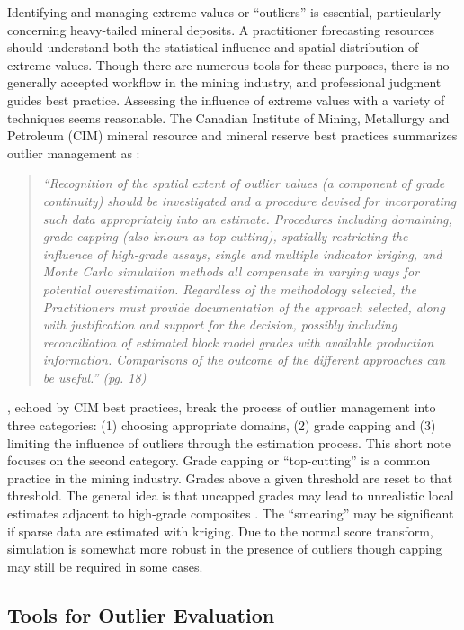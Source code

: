Identifying and managing extreme values or ``outliers'' is essential, particularly concerning heavy-tailed mineral deposits. A practitioner forecasting resources should understand both the statistical influence and spatial distribution of extreme values. Though there are numerous tools for these purposes, there is no generally accepted workflow in the mining industry, and professional judgment guides best practice. Assessing the influence of extreme values with a variety of techniques seems reasonable. The Canadian Institute of Mining, Metallurgy and Petroleum (CIM) mineral resource and mineral reserve best practices summarizes outlier management as \citep{cim2019}:

\blockquote{\textit{``Recognition of the spatial extent of outlier values (a component of grade continuity) should be investigated and a procedure devised for incorporating such data appropriately into an estimate. Procedures including domaining, grade capping (also known as top cutting), spatially restricting the influence of high-grade assays, single and multiple indicator kriging, and Monte Carlo simulation methods all compensate in varying ways for potential overestimation. Regardless of the methodology selected, the Practitioners must provide documentation of the approach selected, along with justification and support for the decision, possibly including reconciliation of estimated block model grades with available production information. Comparisons of the outcome of the different approaches can be useful.'' (pg. 18)}}

\cite{leuangthong2015dealing}, echoed by CIM best practices, break the process of outlier management into three categories: (1) choosing appropriate domains, (2) grade capping and (3) limiting the influence of outliers through the estimation process. This short note focuses on the second category. Grade capping or ``top-cutting'' is a common practice in the mining industry. Grades above a given threshold are reset to that threshold. The general idea is that uncapped grades may lead to unrealistic local estimates adjacent to high-grade composites \citep{nowak2013suggestions}. The ``smearing'' may be significant if sparse data are estimated with kriging. Due to the normal score transform, simulation is somewhat more robust in the presence of outliers though capping may still be required in some cases.

\FloatBarrier
\subsection{Tools for Outlier Evaluation}
\label{subsec:02tools}


